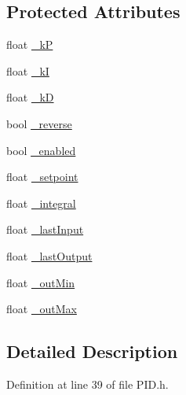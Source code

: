 \subsection*{Protected Attributes}
\begin{DoxyCompactItemize}
\item 
float \hyperlink{classmhvlib_1_1_p_i_d_a5934b986f7b2101c151102aa9d8a3b4a}{\-\_\-k\-P}
\item 
float \hyperlink{classmhvlib_1_1_p_i_d_aee19a521b92e4c0a4b35e35a92b10788}{\-\_\-k\-I}
\item 
float \hyperlink{classmhvlib_1_1_p_i_d_a52a95f70a6235bee3cc395dfa8d009cb}{\-\_\-k\-D}
\item 
bool \hyperlink{classmhvlib_1_1_p_i_d_a4f734792b8105b3b5c1ec412d934fcf2}{\-\_\-reverse}
\item 
bool \hyperlink{classmhvlib_1_1_p_i_d_a0644293ed53cbe44a5dfcd11f70fdf77}{\-\_\-enabled}
\item 
float \hyperlink{classmhvlib_1_1_p_i_d_a51556d4248979a704496105b1fe9dc8c}{\-\_\-setpoint}
\item 
float \hyperlink{classmhvlib_1_1_p_i_d_ae005b6daed4a5fdb051a7be0534a0539}{\-\_\-integral}
\item 
float \hyperlink{classmhvlib_1_1_p_i_d_a3e4094d63aaa4e00ebe6060a7340261d}{\-\_\-last\-Input}
\item 
float \hyperlink{classmhvlib_1_1_p_i_d_ae7b21577ebbf12be988586c386c91e56}{\-\_\-last\-Output}
\item 
float \hyperlink{classmhvlib_1_1_p_i_d_af655645a3642704bf8fe23e2bb336481}{\-\_\-out\-Min}
\item 
float \hyperlink{classmhvlib_1_1_p_i_d_a1f08d07dd7d2c48456cba27b1444c168}{\-\_\-out\-Max}
\end{DoxyCompactItemize}


\subsection{Detailed Description}


Definition at line 39 of file P\-I\-D.\-h.



